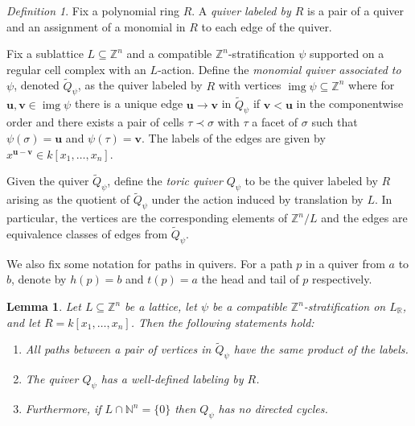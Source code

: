 \documentclass{amsart}
\newcommand{\NN}{\mathbb{N}}
\newcommand{\ZZ}{\mathbb{Z}}
\newcommand{\RR}{\mathbb{R}}
\newcommand{\field}{k}
\DeclareMathOperator{\img}{img}
\newtheorem{lemma}[theorem]{Lemma}
\theoremstyle{remark}
\newtheorem{definition}[theorem]{Definition}
\begin{document}
\begin{definition}
  \label{def:monomial-quiver}
  Fix a polynomial ring $R$. A \emph{quiver labeled by $R$} is a pair of a quiver and an assignment of a monomial in $R$ to each edge of the quiver.
  
  Fix a sublattice $L\subseteq \ZZ^n$ and a compatible $\ZZ^n$-stratification $\psi$ supported on a regular cell complex with an $L$-action.
  Define the \emph{monomial quiver associated to $\psi$}, denoted $\widetilde{Q}_\psi$, as the quiver labeled by $R$ with vertices $\img\psi\subseteq \ZZ^n$ where for $\bm{u},\bm{v}\in\img \psi$ there is a unique edge $\bm{u}\rightarrow \bm{v}$ in $\widetilde{Q}_\psi$ if $\bm{v} < \bm{u}$ in the componentwise order and there exists a pair of cells $\tau\prec \sigma$ with $\tau$ a facet of $\sigma$ such that $\psi(\sigma)=\bm{u}$ and $\psi(\tau)=\bm{v}$. The labels of the edges are given by $x^{\bm{u}-\bm{v}}\in \field[x_1,\ldots,x_n]$.

  Given the quiver $\widetilde{Q}_{\psi}$, define the \emph{toric quiver} $Q_\psi$ to be the quiver labeled by $R$ arising as the quotient of $\widetilde{Q}_\psi$ under the action induced by translation by $L$. In particular, the vertices are the corresponding elements of $\ZZ^n/L$ and the edges are equivalence classes of edges from $\widetilde{Q}_\psi$. 
\end{definition}

We also fix some notation for paths in quivers. For a path $p$ in a quiver from $a$ to $b$, denote by $h(p)=b$ and $t(p)=a$ the head and tail of $p$ respectively.

\begin{lemma}
  \label{lem:quiver-basics}
  Let $L\subseteq \ZZ^n$ be a lattice, let $\psi$ be a compatible $\ZZ^n$-stratification on $L_{\RR}$, and let $R=\field[x_1,\ldots,x_n]$. Then the following statements hold:

  \begin{enumerate}
  \item All paths between a pair of vertices in $\widetilde{Q}_\psi$ have the same product of the labels.
  \item The quiver $Q_\psi$ has a well-defined labeling by $R$.
  \item Furthermore, if $L \cap \NN^n=\{0\}$ then $Q_\psi$ has no directed cycles.
  \end{enumerate}
\end{lemma}
\end{document}
